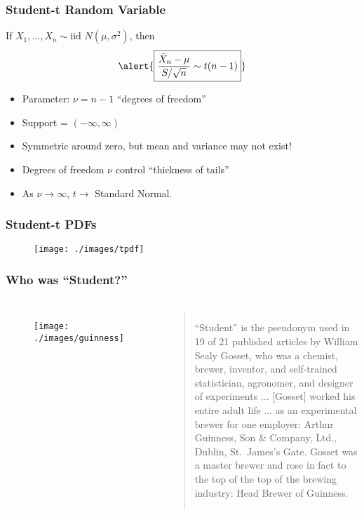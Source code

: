 \begin{frame}
  \frametitle{Student-t Random Variable}
If $X_1, \hdots, X_n \sim \mbox{iid } N(\mu,\sigma^2)$, then
	$$\alert{\boxed{\frac{\bar{X}_n - \mu}{S/\sqrt{n}} \sim t(n-1)}}$$


\begin{itemize}
  \item Parameter: $\nu = n-1$ ``degrees of freedom'' 
	\item Support = $(-\infty, \infty)$
	\item Symmetric around zero, but mean and variance may not exist!
	\item Degrees of freedom $\nu$ control ``thickness of tails''
	\item As $\nu \rightarrow \infty$, $t \rightarrow$ Standard Normal.
\end{itemize}
\vspace{1em}


\end{frame}

\begin{frame}
\frametitle{Student-t PDFs}

\begin{figure}
\texttt{[image: ./images/tpdf]}
\end{figure}
\end{frame}

\begin{frame}
\frametitle{Who was ``Student?''}
\framesubtitle{\href{http://www.aeaweb.org/articles.php?doi=10.1257/jep.22.4.199}{}}

\begin{columns}

\begin{figure}
\vspace{0.75em}

\texttt{[image: ./images/guinness]}
\end{figure}


\scriptsize
\begin{quote}
``Student'' is the pseudonym used in 19 of 21 published articles by William Sealy
Gosset, who was a chemist, brewer, inventor, and self-trained statistician, agronomer, and designer of experiments ... [Gosset] worked his entire adult life ... as an experimental brewer for one employer: Arthur Guinness, Son \& Company, Ltd., Dublin, St.\ James’s Gate. Gosset was a master brewer and rose in fact to the top of the top of the brewing industry: Head Brewer of Guinness.
\end{quote}

\end{columns}

\end{frame}

